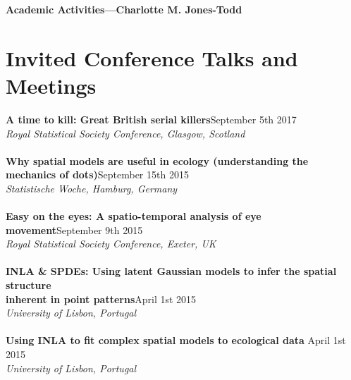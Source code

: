 \documentclass[10pt,letter]{article}
\begin{document}
\LARGE{\textbf{Academic Activities---Charlotte M. Jones-Todd}}

\normalsize

  \noindent\makebox[\linewidth]{\rule{\paperwidth}{0.4pt}}

  \section*{Invited Conference Talks and Meetings}
  \vspace{1mm}
  \textbf{A time to kill: Great British serial killers}\hfill  September 5th 2017\\
         {\sl Royal Statistical Society Conference, Glasgow, Scotland}\\
         \hdashrule[0.5ex]{4cm}{1pt}{1pt}\\
         \textbf{Why spatial models are useful in ecology (understanding the \\
           mechanics of dots)}\hfill September 15th 2015\\
                {\sl Statistische Woche, Hamburg, Germany}\\
                \hdashrule[0.5ex]{4cm}{1pt}{1pt}\\
                \textbf{Easy on the eyes: A spatio-temporal analysis of eye movement}\hfill September 9th 2015\\
                       {\sl Royal Statistical Society Conference, Exeter, UK}\\
                       \hdashrule[0.5ex]{4cm}{1pt}{1pt}\\
                       \textbf{INLA \& SPDEs: 
                         Using latent Gaussian models to infer the spatial structure \\
                         inherent in point patterns}\hfill April 1st 2015\\
                              {\sl University of Lisbon, Portugal}\\
                              \hdashrule[0.5ex]{4cm}{1pt}{1pt}\\
                              \textbf{Using INLA to fit complex spatial models to ecological data } \hfill April 1st 2015\\
                                     {\sl University of Lisbon, Portugal}\\

\end{document}
